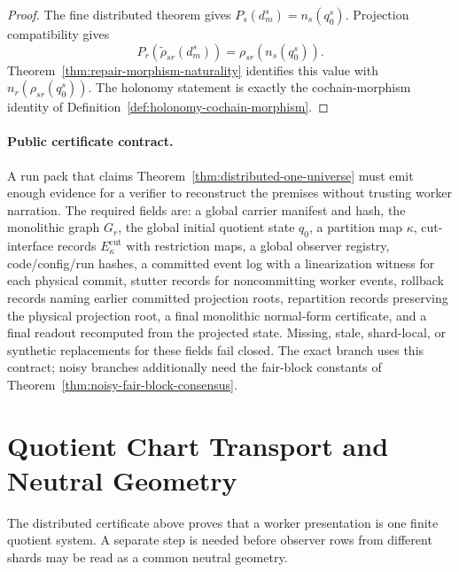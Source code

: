 \documentclass[11pt]{article}
\theoremstyle{remark}
\theoremstyle{plain}
\begin{document}
\begin{proof}
The fine distributed theorem gives \(P_s(d_m^s)=n_s(q_0^s)\). Projection compatibility gives
\[
P_r(\widetilde\rho_{sr}(d_m^s))=\rho_{sr}(n_s(q_0^s)).
\]
Theorem~\ref{thm:repair-morphism-naturality} identifies this value with
\(n_r(\rho_{sr}(q_0^s))\). The holonomy statement is exactly the cochain-morphism identity of
Definition~\ref{def:holonomy-cochain-morphism}.
\end{proof}

\paragraph{Public certificate contract.}
A run pack that claims Theorem~\ref{thm:distributed-one-universe} must emit enough evidence for
a verifier to reconstruct the premises without trusting worker narration. The required fields are:
a global carrier manifest and hash, the monolithic graph \(G_r\), the global initial quotient
state \(q_0\), a partition map \(\kappa\), cut-interface records \(E_\kappa^{\mathrm{cut}}\)
with restriction maps, a global observer registry, code/config/run hashes, a committed event log
with a linearization witness for each physical commit, stutter records for noncommitting worker
events, rollback records naming earlier committed projection roots, repartition records preserving
the physical projection root, a final monolithic normal-form certificate, and a final readout
recomputed from the projected state. Missing, stale, shard-local, or synthetic replacements for
these fields fail closed. The exact branch uses this contract; noisy branches additionally need
the fair-block constants of Theorem~\ref{thm:noisy-fair-block-consensus}.

\section{Quotient Chart Transport and Neutral Geometry}
\label{sec:quotient-neutral-geometry}

The distributed certificate above proves that a worker presentation is one finite quotient
system. A separate step is needed before observer rows from different shards may be read as a
common neutral geometry.
\end{document}
